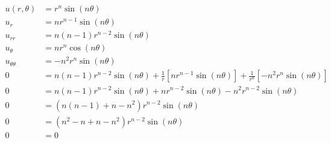 \documentclass[../../HW07.tex]{subfiles}
\begin{document}
\begin{align*}
    u(r,\theta)      & = r^{n}\sin(n\theta)                                                                                                                    \\
    u_{r}            & =nr^{n-1}\sin(n\theta)                                                                                                                  \\
    u_{rr}           & =n(n-1)r^{n-2}\sin(n\theta)                                                                                                             \\
    u_{\theta}       & =nr^{n}\cos(n\theta)                                                                                                                    \\
    u_{\theta\theta} & =-n^{2}r^{n}\sin(n\theta)                                                                                                               \\
    0                & = n(n-1)r^{n-2}\sin(n\theta) + \frac{1}{r}\left[ nr^{n-1}\sin(n\theta) \right] + \frac{1}{r^{n}}\left[ -n^{2}r^{n}\sin(n\theta) \right] \\
    0                & = n(n-1)r^{n-2}\sin(n\theta) + nr^{n-2}\sin(n\theta) - n^{2}r^{n-2}\sin(n\theta)                                                        \\
    0                & = \left( n(n-1) + n - n^{2} \right)r^{n-2}\sin(n\theta)                                                                                 \\
    0                & = \left( n^{2} - n + n - n^{2} \right)r^{n-2}\sin(n\theta)                                                                              \\
    0                & = 0                                                                                                                                     \\
\end{align*}
\end{document}
